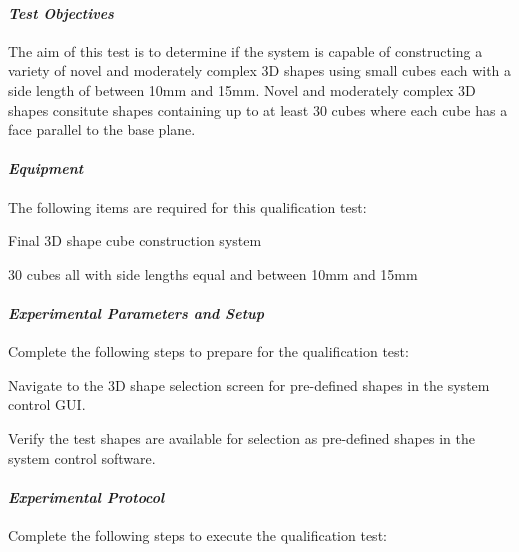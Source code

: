 \paragraph{\textit{Test Objectives}}

The aim of this test is to determine if the system is capable of constructing a variety of novel and moderately complex 3D shapes using small cubes each with a side length of between 10mm and 15mm. Novel and moderately complex 3D shapes consitute shapes containing up to at least 30 cubes where each cube has a face parallel to the base plane.

\paragraph{\textit{Equipment}} 

The following items are required for this qualification test:

\begin{compactitem}
	\item Final 3D shape cube construction system
	\item 30 cubes all with side lengths equal and between 10mm and 15mm
\end{compactitem}

\paragraph{\textit{Experimental Parameters and Setup}}

Complete the following steps to prepare for the qualification test:

\begin{compactenum}
	\item Navigate to the 3D shape selection screen for pre-defined shapes in the system control GUI.
	\item Verify the test shapes are available for selection as pre-defined shapes in the system control software.
\end{compactenum}

\paragraph{\textit{Experimental Protocol}}

Complete the following steps to execute the qualification test:

